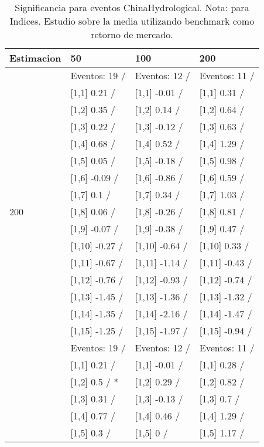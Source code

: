 \begin{table}

\caption{Significancia para eventos ChinaHydrological. Nota: para Indices. Estudio sobre la media utilizando benchmark como retorno de mercado.}
\centering
\begin{tabular}[t]{llll}
\toprule
Estimacion & 50 & 100 & 200\\
\midrule
 & Eventos:  19 / & Eventos:  12 / & Eventos:  11 /\\
 & {}[1,1] 0.21  / & {}[1,1] -0.01  / & {}[1,1] 0.31  /\\
 & {}[1,2] 0.35  / & {}[1,2] 0.14  / & {}[1,2] 0.64  /\\
 & {}[1,3] 0.22  / & {}[1,3] -0.12  / & {}[1,3] 0.63  /\\
 & {}[1,4] 0.68  / & {}[1,4] 0.52  / & {}[1,4] 1.29  /\\
\addlinespace
 & {}[1,5] 0.05  / & {}[1,5] -0.18  / & {}[1,5] 0.98  /\\
 & {}[1,6] -0.09  / & {}[1,6] -0.86  / & {}[1,6] 0.59  /\\
 & {}[1,7] 0.1  / & {}[1,7] 0.34  / & {}[1,7] 1.03  /\\
200 & {}[1,8] 0.06  / & {}[1,8] -0.26  / & {}[1,8] 0.81  /\\
 & {}[1,9] -0.07  / & {}[1,9] -0.38  / & {}[1,9] 0.47  /\\
\addlinespace
 & {}[1,10] -0.27  / & {}[1,10] -0.64  / & {}[1,10] 0.33  /\\
 & {}[1,11] -0.67  / & {}[1,11] -1.14  / & {}[1,11] -0.43  /\\
 & {}[1,12] -0.76  / & {}[1,12] -0.93  / & {}[1,12] -0.74  /\\
 & {}[1,13] -1.45  / & {}[1,13] -1.36  / & {}[1,13] -1.32  /\\
 & {}[1,14] -1.35  / & {}[1,14] -2.16  / & {}[1,14] -1.47  /\\
\addlinespace
 & {}[1,15] -1.25  / & {}[1,15] -1.97  / & {}[1,15] -0.94  /\\
 & Eventos:  19 / & Eventos:  12 / & Eventos:  11 /\\
 & {}[1,1] 0.21  / & {}[1,1] -0.01  / & {}[1,1] 0.28  /\\
 & {}[1,2] 0.5  / * & {}[1,2] 0.29  / & {}[1,2] 0.82  /\\
 & {}[1,3] 0.31  / & {}[1,3] -0.13  / & {}[1,3] 0.7  /\\
\addlinespace
 & {}[1,4] 0.77  / & {}[1,4] 0.46  / & {}[1,4] 1.29  /\\
 & {}[1,5] 0.3  / & {}[1,5] 0  / & {}[1,5] 1.17  /\\

\end{tabular}
\end{table}
